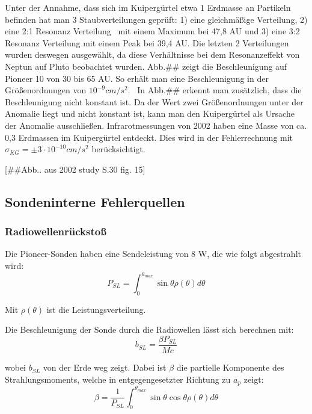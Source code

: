 Unter der Annahme, dass sich im Kuiperg\"urtel etwa 1 Erdmasse an
Partikeln befinden hat man 3 Staubverteilungen gepr\"uft: 1) eine
gleichm\"a{\ss}ige Verteilung, 2) eine 2:1 Resonanz Verteilung \ mit
einem Maximum bei 47,8 AU und 3) eine 3:2 Resonanz Verteilung mit einem
Peak bei 39,4 AU. Die letzten 2 Verteilungen wurden deswegen
ausgew\"ahlt, da diese Verh\"altnisse bei dem Resonanzeffekt von Neptun
auf Pluto beobachtet wurden. Abb.\#\# zeigt die Beschleunigung auf
Pioneer 10 von 30 bis 65 AU. So erh\"alt man eine Beschleunigung in der
Gr\"o{\ss}enordnungen von  $10^{-9}\mathit{cm}/s^{2}$. \ In Abb.\#\#
erkennt man zus\"atzlich, dass die Beschleunigung nicht konstant ist.
Da der Wert zwei Gr\"o{\ss}enordnungen unter der Anomalie liegt und
nicht konstant ist, kann man den Kuiperg\"urtel als Ursache der
Anomalie ausschlie{\ss}en. Infrarotmessungen von 2002 haben eine Masse
von ca. 0,3 Erdmassen im Kuiperg\"urtel entdeckt. Dies wird in der
Fehlerrechnung mit \  $\sigma _{\mathit{KG}}=\pm 3\cdot
10^{-10}\mathit{cm}/s^{2}$ ber\"ucksichtigt\cite{Anderson2002}.

[\#\#Abb.. aus 2002 study S.30 fig. 15]


\bigskip

\subsection{Sondeninterne Fehlerquellen}

\subsubsection{Radiowellenr\"ucksto{\ss}}

Die Pioneer-Sonden haben eine Sendeleistung von 8 W, die wie folgt
abgestrahlt wird:
\begin{equation}
P_{\mathit{SL}}=\int _{0}^{\theta _{\mathit{max}}}\sin \theta \rho
(\theta )d\theta
\end{equation}

Mit  $\rho (\theta )$ ist die Leistungsverteilung.

Die Beschleunigung der Sonde durch die Radiowellen l\"asst sich
berechnen mit:
\begin{equation}
b_{\mathit{SL}}=\frac{\beta P_{\mathit{SL}}}{\mathit{Mc}}
\end{equation}

wobei  $b_{\mathit{SL}}$ von der Erde weg zeigt. Dabei ist  $\beta $ die
partielle Komponente des Strahlungsmoments, welche in entgegengesetzter
Richtung zu  $a_{p}$ zeigt\cite{Anderson2002}:
\begin{equation}
\beta =\frac{1}{P_{\mathit{SL}}}\int _{0}^{\theta _{\mathit{max}}}\sin
\theta \cos \theta \rho (\theta )d\theta
\end{equation}

